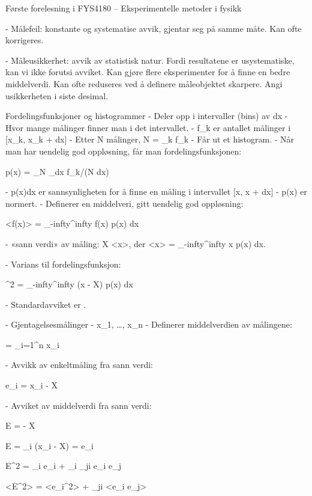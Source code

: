 \documentclass[norsk, 12pt]{article}
\title{}
\begin{document}
Første forelesning i FYS4180 – Eksperimentelle metoder i fysikk

  - Målefeil: konstante og systematise avvik, gjentar seg på samme måte. Kan ofte korrigeres.

  - Måleusikkerhet: avvik av statistisk natur. Fordi resultatene er usystematiske, kan vi ikke forutsi avviket.
    Kan gjøre flere eksperimenter for å finne en bedre middelverdi.
    Kan ofte reduseres ved å definere måleobjektet skarpere.
    Angi usikkerheten i siste desimal.

  Fordelingsfunksjoner og histogrammer
    - Deler opp i intervaller (bins) av dx
    - Hvor mange målinger finner man i det intervallet.
    - f_k er antallet målinger i [x_k, x_k + dx]
    - Etter N målinger, N = \sum_{k} f_k
    - Får ut et histogram.
    - Når man har uendelig god oppløsning, får man fordelingsfunksjonen:
      
      p(x) = \lim_{N\rightarrow\infty} \lim_{dx} f_k/(N dx)
    
    - p(x)dx er sannsynligheten for å finne en måling i intervallet [x, x + dx]
    - p(x) er normert.
    - Definerer en middelveri, gitt uendelig god oppløsning:
    
      <f(x)> = \int_{-infty}^{infty} f(x) p(x) dx

    - «sann verdi» av måling: X \equiv <x>, der <x> = \int_{-infty}^{infty} x p(x) dx.
    
    - Varians til fordelingsfunksjon:

      \sigma^2 = \int_{-infty}^{infty} (x - X) p(x) dx

    - Standardavviket er \sigma.

    - Gjentagelsesmålinger
      - x_1, …, x_n
      - Definerer middelverdien av målingene:
        
        \xbar = \sum_{i=1}^n x_i

      - Avvikk av enkeltmåling fra sann verdi:
        
        e_i = x_i - X

      - Avviket av middelverdi fra sann verdi:

        E = \xbar - X

        E = \sum_i (x_i - X) = \sum e_i

        E^2 = \sum_i e_i + \sum_i \sum_{j\neq i} e_i e_j

        <E^2> = \sum <e_i^2> +  \sum_{j\neq i} <e_i e_j>
\end{document}
